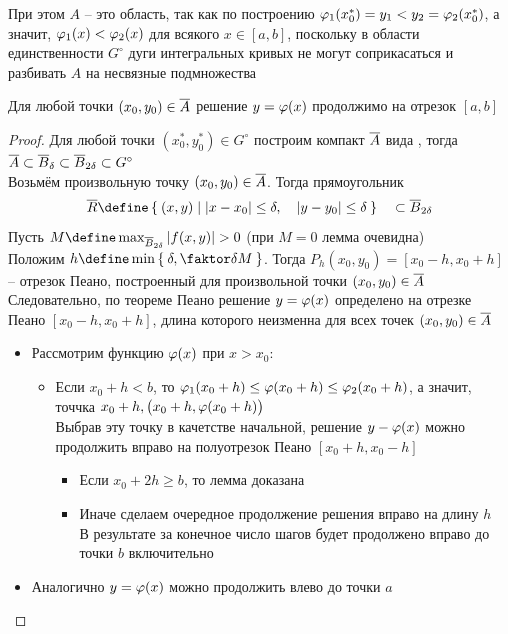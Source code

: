 При этом $ A $  -- это область, так как по построению $ \varphi_1(x_0^*) = y_1 < y_2 = \varphi_2(x_0^*) $, а значит, $ \varphi_1(x) < \varphi_2(x) $ для всякого $ x \in [a, b] $, поскольку в области единственности $ G^\circ $ дуги интегральных кривых не могут соприкасаться и разбивать $ A $ на несвязные подмножества

\begin{lemma}\label{lm:comp}
    Для любой точки $ (x_0, y_0) \in \overline{A} $ решение  $ y = \varphi(x) $ продолжимо на отрезок $ [a, b] $
\end{lemma}

\begin{proof}
    Для любой точки $ (x_0^*, y_0^*) \in G^\circ $ построим компакт $ \overline{A} $ вида , тогда $ \overline{A} \subset \overline{B}_\delta \subset \overline{B}_{2\delta} \subset G^\circ $ \\
    Возьмём произвольную точку $ (x_0, y_0) \in \overline{A} $. Тогда прямоугольник
    $$ \ol{R} \define \set{(x, y) | {} |x - x_0| \le \delta, \quad | y - y_0| \le \delta} \quad \sub \ol{B}_{2\delta} $$
    Пусть $ M \define \max_{\ol{B}_{2\delta}}|f(x, y)| > 0 $ (при $ M = 0 $ лемма очевидна) \\
    Положим $ h \define \min\set{\delta, \faktor\delta{M}} $. Тогда $ P_h(x_0, y_0) = [x_0 - h, x_0 + h] $ -- отрезок Пеано, построенный для произвольной точки $ (x_0, y_0) \in \overline{A} $ \\
    Следовательно, по теореме Пеано решение  $ y = \varphi(x) $ определено на отрезке Пеано $ [x_0 - h, x_0 + h] $, длина которого неизменна для всех точек $ (x_0, y_0) \in \overline{A} $
    \begin{itemize}
    	\item Рассмотрим функцию $ \varphi(x) $ при $ x > x_0 $:
        \begin{itemize}
        	\item Если $ x_0 + h < b $, то $ \varphi_1(x_0 + h) \le \varphi(x_0 + h) \le \varphi_2(x_0 + h) $, а значит, точчка $ x_0 + h, \big( x_0 + h, \varphi(x_0 + h) \big) $ \\
            Выбрав эту точку в качетстве начальной, решение $ y - \varphi(x) $ можно продолжить вправо на полуотрезок Пеано $ [x_0 + h, x_0 - h] $
            \begin{itemize}
            	\item Если $ x_0 + 2h \ge b $, то лемма доказана
                \item Иначе сделаем очередное продолжение решения вправо на длину $ h $ \\
                В результате за конечное число шагов будет продолжено вправо до точки $ b $ включительно
            \end{itemize}
        \end{itemize}
        \item Аналогично $ y = \varphi(x) $ можно продолжить влево до точки $ a $
    \end{itemize}
\end{proof}

